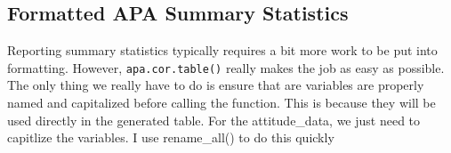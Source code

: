 \documentclass[]{book}
\newenvironment{Shaded}{\begin{snugshade}}{\end{snugshade}}
\newcommand{\DataTypeTok}[1]{\textcolor[rgb]{0.13,0.29,0.53}{#1}}
\newcommand{\DecValTok}[1]{\textcolor[rgb]{0.00,0.00,0.81}{#1}}
\newcommand{\KeywordTok}[1]{\textcolor[rgb]{0.13,0.29,0.53}{\textbf{#1}}}
\newcommand{\NormalTok}[1]{#1}
\newcommand{\OperatorTok}[1]{\textcolor[rgb]{0.81,0.36,0.00}{\textbf{#1}}}
\newcommand{\StringTok}[1]{\textcolor[rgb]{0.31,0.60,0.02}{#1}}
\theoremstyle{definition}
\theoremstyle{definition}
\theoremstyle{definition}
\theoremstyle{remark}
\begin{document}
\hypertarget{formatted-apa-summary-statistics}{%
\subsection{Formatted APA Summary Statistics}\label{formatted-apa-summary-statistics}}

Reporting summary statistics typically requires a bit more work to be put into formatting. However, \texttt{apa.cor.table()} really makes the job as easy as possible. The only thing we really have to do is ensure that are variables are properly named and capitalized before calling the function. This is because they will be used directly in the generated table. For the attitude\_data, we just need to capitlize the variables. I use rename\_all() to do this quickly

\begin{Shaded}
\end{Shaded}
\end{document}
